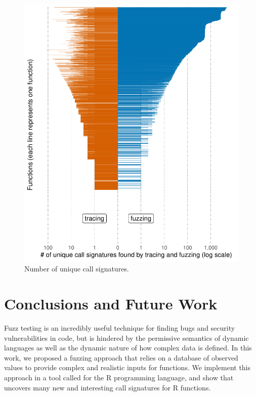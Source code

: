 \documentclass[sigplan,nonacm,anonymous,review]{acmart}
\begin{document}

\begin{figure}
    \centering
    \includegraphics[width=\columnwidth]{code-and-figures/uf-call-signatures.pdf}
    \caption{Number of unique call signatures.}
    \label{fig:call-signatures}
\end{figure}

\section{Conclusions and Future Work}
\label{sec:conclusions}

Fuzz testing is an incredibly useful technique for finding bugs and security vulnerabilities in code, but is hindered by the permissive semantics of dynamic languages as well as the dynamic nature of how complex data is defined.
In this work, we proposed a fuzzing approach that relies on a database of observed values to provide complex and realistic inputs for functions.
We implement this approach in a tool called \tool for the R programming language, and show that \tool uncovers many new and interesting call signatures for R functions.
\end{document}
